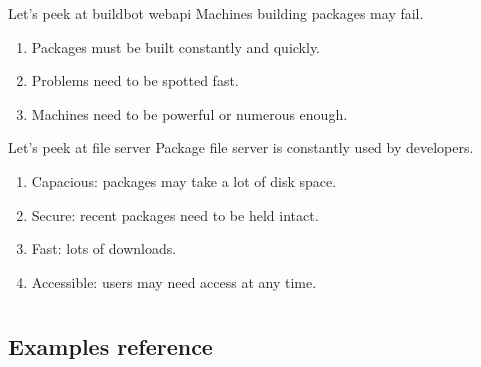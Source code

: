 \documentclass{beamer}
\begin{document}
\begin{frame}[fragile]{Let's peek at buildbot webapi \color{blue}{(example)}}
    Machines building packages may fail.
    \vspace{\baselineskip}
    \begin{enumerate}
        \item{Packages must be built constantly and quickly.}
        \item{Problems need to be spotted fast.}
        \item{Machines need to be powerful or numerous enough.}
    \end{enumerate}
\end{frame}

\begin{frame}[fragile]{Let's peek at file server \color{blue}{(example)}}
    Package file server is constantly used by developers.
    \vspace{\baselineskip}
    \begin{enumerate}
        \item{Capacious: packages may take a lot of disk space.}
        \item{Secure: recent packages need to be held intact.}
        \item{Fast: lots of downloads.}
        \item{Accessible: users may need access at any time.}
    \end{enumerate}
\end{frame}

\appendix

\section{\appendixname}

\subsection{Examples reference}
\end{document}

